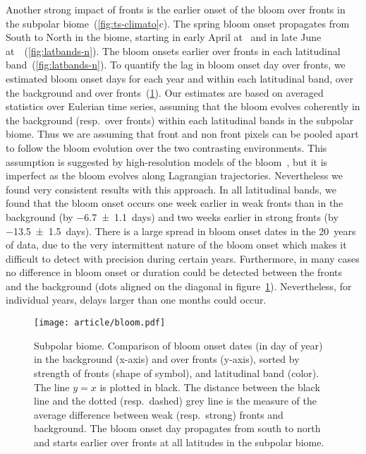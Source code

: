 Another strong impact of fronts is the earlier onset of the bloom over fronts in the subpolar biome~(\cref{fig:ts-climato}c).
The spring bloom onset propagates from South to North in the biome, starting in early April at~ and in late June at~~(\cref{fig:latbands-n}).
The bloom onsets earlier over fronts in each latitudinal band~(\cref{fig:latbands-n}).
To quantify the lag in bloom onset day over fronts, we estimated bloom onset days for each year and within each latitudinal band, over the background and over fronts~(\cref{fig:bloom}).
Our estimates are based on averaged statistics over Eulerian time series, assuming that the bloom evolves coherently in the background (resp.\ over fronts) within each latitudinal bands in the subpolar biome.
Thus we are assuming that front and non front pixels can be pooled apart to follow the bloom evolution over the two contrasting environments.
This assumption is suggested by high-resolution models of the bloom~\parencite[e.g.][]{levy_2005a, karleskind_2011}, but it is imperfect as the bloom evolves along Lagrangian trajectories.
Nevertheless we found very consistent results with this approach.
In all latitudinal bands, we found that the bloom onset occurs one week earlier in weak fronts than in the background (by \num{-6.7 \pm 1.1}~days) and two weeks earlier in strong fronts (by \num{-13.5 \pm 1.5}~days).
There is a large spread in bloom onset dates in the 20~years of data, due to the very intermittent nature of the bloom onset \parencite{keerthi_2021} which makes it difficult to detect with precision during certain years.
Furthermore, in many cases no difference in bloom onset or duration could be detected between the fronts and the background (dots aligned on the diagonal in figure~\ref{fig:bloom}).
Nevertheless, for individual years, delays larger than one months could occur.

\begin{figure}
  \centering
  \texttt{[image: article/bloom.pdf]}
  \caption[Comparison of bloom onset dates in the background and over fronts]{%
    Subpolar biome. Comparison of bloom onset dates (in day of year) in the background (x-axis) and over fronts (y-axis), sorted by strength of fronts (shape of symbol), and latitudinal band (color).
    The line \(y=x\) is plotted in black.
    The distance between the black line and the dotted (resp.\ dashed) grey line is the measure of the average difference between weak (resp.\ strong) fronts and background.
    The bloom onset day propagates from south to north and starts earlier over fronts at all latitudes in the subpolar biome.
  }%
  \label{fig:bloom}
\end{figure}


